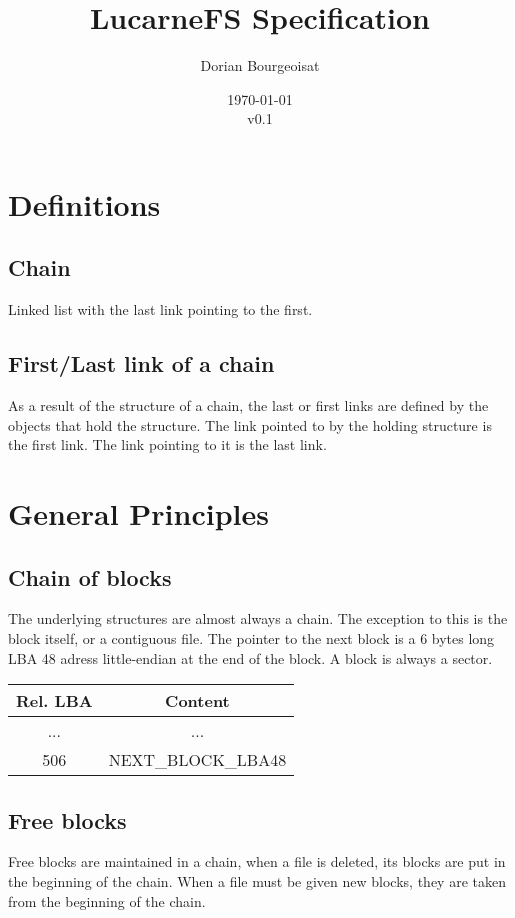 \documentclass{article}
\title{LucarneFS Specification}
\author{Dorian Bourgeoisat}
\date{\today\\v0.1}
\begin{document}
\maketitle
\newpage
\tableofcontents

\newpage
\section{Definitions}
\subsection{Chain}
Linked list with the last link pointing to the first.
\subsection{First/Last link of a chain}
As a result of the structure of a chain, the last or first links are defined by the objects that hold the structure. The link pointed to by the holding structure is the first link. The link pointing to it is the last link.

\section{General Principles}
\subsection{Chain of blocks}
The underlying structures are almost always a chain. The exception to this is the block itself, or a contiguous file.
The pointer to the next block is a 6 bytes long LBA 48 adress little-endian at the end of the block. A block is always a sector.

\begin{tabular}{|c|c|}
    \hline
    Rel. LBA & Content \\
    \hline
    ... & ...  \\
    \hline
    506 & NEXT\_BLOCK\_LBA48  \\
    \hline
  \end{tabular}

\subsection{Free blocks}
Free blocks are maintained in a chain, when a file is deleted, its blocks are put in the beginning of the chain. When a file must be given new blocks, they are taken from the beginning of the chain.
\end{document}
